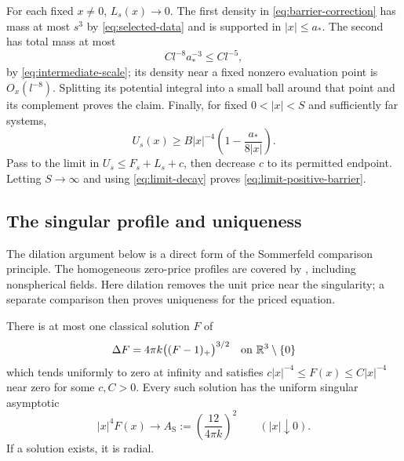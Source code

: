 For each fixed $x\ne0$, $L_s(x)\to0$.  The first density in
\cref{eq:barrier-correction} has mass at most $s^3$ by
\cref{eq:selected-data} and is supported in $|x|\le a_*$.
The second has total mass at most
\[
 C l^{-8}a_*^{-3}\le C l^{-5},
\]
by \cref{eq:intermediate-scale}; its density near a fixed nonzero
evaluation point is $O_x(l^{-8})$.  Splitting its potential integral
into a small ball around that point and its complement proves the
claim.  Finally, for fixed $0<|x|<S$ and sufficiently far systems,
\[
 U_s(x)\ge B|x|^{-4}\left(1-\frac{a_*}{8|x|}\right).
\]
Pass to the limit in $U_s\le F_s+L_s+c$, then decrease $c$ to its
permitted endpoint.  Letting $S\to\infty$ and using
\cref{eq:limit-decay} proves \cref{eq:limit-positive-barrier}.

\subsection{The singular profile and uniqueness}

The dilation argument below is a direct form of the Sommerfeld comparison
principle. The homogeneous zero-price profiles are covered by
\cite[Lemma~4.4 and Remark~4.5]{Solovej2003}, including nonspherical fields.
Here dilation removes the unit price near the singularity; a separate
comparison then proves uniqueness for the priced equation.

\begin{lemma}\label{lem:singular-profile}
There is at most one classical solution $F$ of
\[
 \Delta F=4\pi k\bigl((F-1)_+\bigr)^{3/2}
       \quad\text{on }\mathbb R^3\setminus\{0\}
\]
which tends uniformly to zero at infinity and satisfies
$c|x|^{-4}\le F(x)\le C|x|^{-4}$ near zero for some $c,C>0$.
Every such solution has the uniform singular asymptotic
\begin{equation}\label{eq:sommerfeld-coefficient}
 |x|^4F(x)\longrightarrow
 A_{\mathrm S}:=\left(\frac{12}{4\pi k}\right)^2
       \qquad(|x|\downarrow0).
\end{equation}
If a solution exists, it is radial.
\end{lemma}

